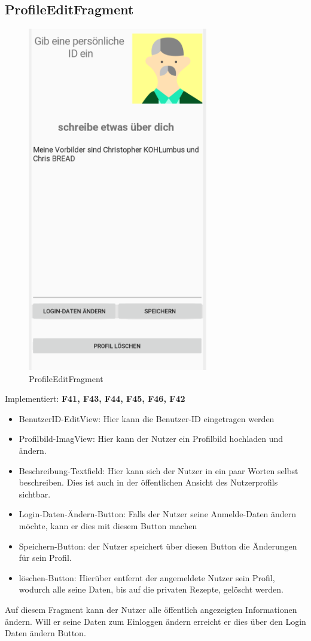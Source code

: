 \subsection{ProfileEditFragment}
\begin{figure}[H]
	\centering
	\includegraphics[width=0.7\textwidth]{pics/profileEditragment.png}%
	\caption{ProfileEditFragment}%
	\label{view}%
\end{figure}
Implementiert: \textbf{F41, F43, F44, F45, F46, F42}
\begin{itemize}[nosep]
	\item BenutzerID-EditView: Hier kann die Benutzer-ID eingetragen werden
	\item Profilbild-ImagView: Hier kann der Nutzer ein Profilbild hochladen und ändern.
	\item Beschreibung-Textfield: Hier kann sich der Nutzer in ein paar Worten selbst beschreiben. Dies ist auch in der öffentlichen Ansicht des Nutzerprofils sichtbar.
	\item Login-Daten-Ändern-Button: Falls der Nutzer seine Anmelde-Daten ändern möchte, kann er dies mit diesem Button machen
	\item Speichern-Button: der Nutzer speichert über diesen Button die Änderungen für sein Profil.
	\item löschen-Button: Hierüber entfernt der angemeldete Nutzer sein Profil, wodurch alle seine Daten, bis auf die privaten Rezepte, gelöscht werden.
\end{itemize}
Auf diesem Fragment kann der Nutzer alle öffentlich angezeigten Informationen ändern. Will er seine Daten zum Einloggen ändern erreicht er dies über den Login Daten ändern Button.

